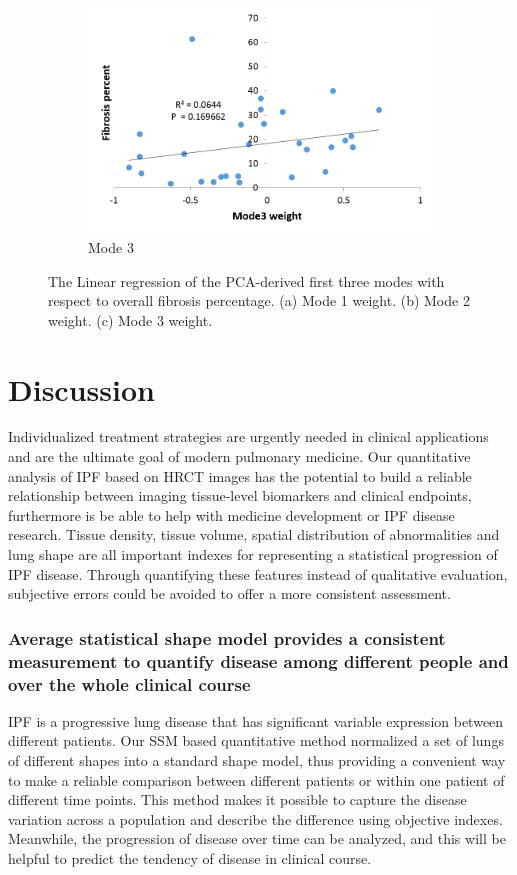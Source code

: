 \begin{figure}[H]
\begin{subfigure}{.65\linewidth}
  \includegraphics[width=\linewidth,trim={{.0\wd0} {.0\wd0} {.0\wd0} {.0\wd0}},clip]{QuantitativeAnalysis/Image/Mode3AgainstFibrosis.png}
  \caption{Mode 3}
  \label{fig:ShapeVSFibrosis-c}
\end{subfigure}
\caption{ The Linear regression of the PCA-derived first three modes with respect to overall fibrosis percentage. (a) Mode 1 weight. (b) Mode 2 weight. (c) Mode 3  weight.}
\label{fig:ShapeVSFibrosis}
\end{figure}

\section{Discussion} \label{QuantitativeDiscussion}
Individualized treatment strategies are urgently needed in clinical applications and are the ultimate goal of modern pulmonary medicine. Our quantitative analysis of IPF based on HRCT images has the potential to build a reliable relationship between imaging tissue-level biomarkers and clinical endpoints, furthermore is be able to help with medicine development or IPF disease research. Tissue density, tissue volume, spatial distribution of abnormalities and lung shape are all important indexes for representing a statistical progression of IPF disease. Through quantifying these features instead of qualitative evaluation, subjective errors could be avoided to offer a more consistent assessment.  

\subsubsection{Average statistical shape model provides a consistent measurement to quantify disease among different people and over the whole clinical course}
IPF is a progressive lung disease that has significant variable expression between different patients. Our SSM based quantitative method normalized a set of lungs of different shapes into a standard shape model, thus providing a convenient way to make a reliable comparison between different patients or within one patient of different time points. This method makes it possible to capture the disease variation across a population and describe the difference using objective indexes. Meanwhile, the progression of disease over time can be analyzed, and this will be helpful to predict the tendency of disease in clinical course. 

